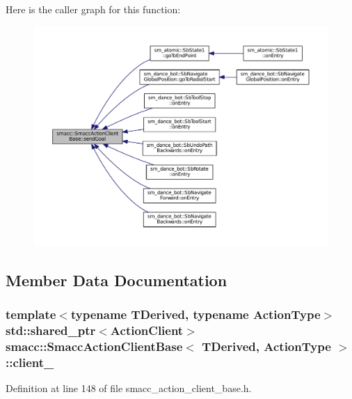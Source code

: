 Here is the caller graph for this function\+:
\nopagebreak
\begin{figure}[H]
\begin{center}
\leavevmode
\includegraphics[width=350pt]{classsmacc_1_1SmaccActionClientBase_a2ec9e5fb96ecc517a815cda209eb1b51_icgraph}
\end{center}
\end{figure}




\subsection{Member Data Documentation}
\subsubsection[{\texorpdfstring{client\+\_\+}{client_}}]{\setlength{\rightskip}{0pt plus 5cm}template$<$typename T\+Derived, typename Action\+Type$>$ std\+::shared\+\_\+ptr$<${\bf Action\+Client}$>$ {\bf smacc\+::\+Smacc\+Action\+Client\+Base}$<$ T\+Derived, Action\+Type $>$\+::client\+\_\+\hspace{0.3cm}{\ttfamily [protected]}}\hypertarget{classsmacc_1_1SmaccActionClientBase_a5ec5c74015ea4e8b61d017f666a4ce17}{}\label{classsmacc_1_1SmaccActionClientBase_a5ec5c74015ea4e8b61d017f666a4ce17}


Definition at line 148 of file smacc\+\_\+action\+\_\+client\+\_\+base.\+h.

